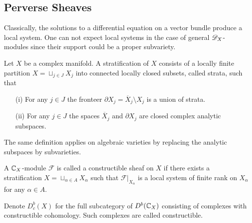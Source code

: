 \subsection{Perverse Sheaves}
  Classically, the solutions to a differential equation on a vector bundle produce a local system.
  One can not expect local systems in the case of general $\mathscr{D}_X$-modules since their support could be a proper subvariety.
  \begin{definition}
    Let $X$ be a complex manifold. A stratification of $X$ consists of a locally finite partition $X  = \sqcup_{j\in J} X_j$ into connected locally closed subsets, called strata, such that
    \begin{enumerate}
      \item[(i)] For any $j\in J$ the fronteer $\partial X_j = \overline{X}_j\setminus X_j$ is a union of strata.
      \item[(ii)] For any $j\in J$ the spaces $\overline{X}_j$ and $\partial X_j$ are closed complex analytic subspaces.
    \end{enumerate}
  \end{definition}
  The same definition applies on algebraic varieties by replacing the analytic subspaces by subvarieties.
  \begin{definition}
     A $\mathbb{C}_X$-module $\mathcal{F}$ is called a constructible sheaf on $X$ if there exists a stratification $X = \sqcup_{\alpha\in A}X_\alpha$ such that $\mathcal{F}\vert_{X_\alpha}$ is a local system of finite rank on $X_\alpha$ for any $\alpha \in A$.
  \end{definition}
  Denote $D^b_c(X)$ for the full subcategory of $D^b(\mathbb{C}_X)$ consisting of complexes with constructible cohomology.
  Such complexes are called constructible.

